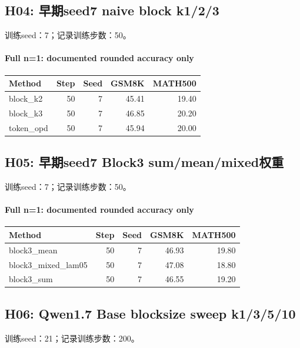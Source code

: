 \subsection{H04: 早期seed7 naive block k1/2/3}
\label{history:early_blocksum50}
训练seed：7；记录训练步数：50。
\paragraph{Full n=1: documented rounded accuracy only}
{\footnotesize\setlength{\tabcolsep}{3.5pt}
\begin{longtable}{@{}p{1.4in}rrrr@{}}
\toprule
Method & Step & Seed & GSM8K & MATH500 \\
\midrule\endhead
block\_\allowbreak{}k2 & 50 & 7 & 45.41 & 19.40 \\
block\_\allowbreak{}k3 & 50 & 7 & 46.85 & 20.20 \\
token\_\allowbreak{}opd & 50 & 7 & 45.94 & 20.00 \\
\bottomrule\end{longtable}
}
\subsection{H05: 早期seed7 Block3 sum/mean/mixed权重}
\label{history:early_blockadv50}
训练seed：7；记录训练步数：50。
\paragraph{Full n=1: documented rounded accuracy only}
{\footnotesize\setlength{\tabcolsep}{3.5pt}
\begin{longtable}{@{}p{1.4in}rrrr@{}}
\toprule
Method & Step & Seed & GSM8K & MATH500 \\
\midrule\endhead
block3\_\allowbreak{}mean & 50 & 7 & 46.93 & 19.80 \\
block3\_\allowbreak{}mixed\_\allowbreak{}lam05 & 50 & 7 & 47.08 & 18.80 \\
block3\_\allowbreak{}sum & 50 & 7 & 46.55 & 19.20 \\
\bottomrule\end{longtable}
}
\subsection{H06: Qwen1.7 Base blocksize sweep k1/3/5/10}
\label{history:qwen17_sweep}
训练seed：21；记录训练步数：200。
